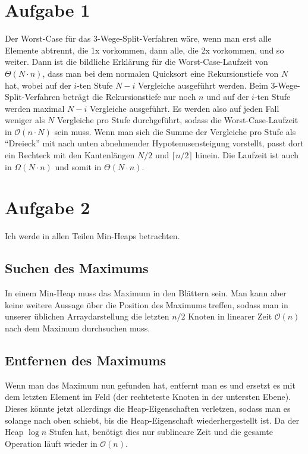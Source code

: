 \documentclass[10pt,a4paper]{article}
\begin{document}
\section{Aufgabe 1}
Der Worst-Case für das 3-Wege-Split-Verfahren wäre, wenn man erst alle Elemente abtrennt, die 1x vorkommen, dann alle, die 2x vorkommen, und so weiter.
Dann ist die bildliche Erklärung für die Worst-Case-Laufzeit von $\Theta(N \cdot n)$, dass man bei dem normalen Quicksort eine Rekursionstiefe von $N$ hat, wobei auf der $i$-ten Stufe $N - i$ Vergleiche ausgeführt werden.
Beim 3-Wege-Split-Verfahren beträgt die Rekursionstiefe nur noch $n$ und auf der $i$-ten Stufe werden maximal $N - i$ Vergleiche ausgeführt.
Es werden also auf jeden Fall weniger als $N$ Vergleiche pro Stufe durchgeführt, sodass die Worst-Case-Laufzeit in $\mathcal{O}(n \cdot N)$ sein muss.
Wenn man sich die Summe der Vergleiche pro Stufe als ``Dreieck'' mit nach unten abnehmender Hypotenusensteigung vorstellt, passt dort ein Rechteck mit den Kantenlängen $N / 2$ und $\lceil n / 2 \rceil$ hinein.
Die Laufzeit ist auch in $\Omega(N \cdot n)$ und somit in $\Theta(N \cdot n)$.

\section{Aufgabe 2}
Ich werde in allen Teilen Min-Heaps betrachten.

\subsection{Suchen des Maximums}
In einem Min-Heap muss das Maximum in den Blättern sein.
Man kann aber keine weitere Aussage über die Position des Maximums treffen, sodass man in unserer üblichen Arraydarstellung die letzten $n / 2$ Knoten in linearer Zeit $\mathcal{O}(n)$ nach dem Maximum durchsuchen muss.

\subsection{Entfernen des Maximums}
Wenn man das Maximum nun gefunden hat, entfernt man es und ersetzt es mit dem letzten Element im Feld (der rechteteste Knoten in der untersten Ebene).
Dieses könnte jetzt allerdings die Heap-Eigenschaften verletzen, sodass man es solange nach oben schiebt, bis die Heap-Eigenschaft wiederhergestellt ist.
Da der Heap $\log n$ Stufen hat, benötigt dies nur sublineare Zeit und die gesamte Operation läuft wieder in $\mathcal{O}(n)$.
\end{document}
